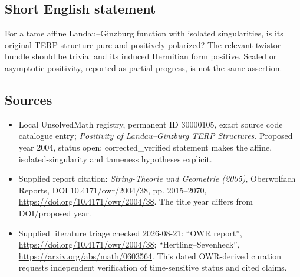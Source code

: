 \documentclass[11pt]{article}
\begin{document}
\subsection{Short English statement}
For a tame affine Landau--Ginzburg function with isolated singularities, is its original TERP structure pure and positively polarized? The relevant twistor bundle should be trivial and its induced Hermitian form positive. Scaled or asymptotic positivity, reported as partial progress, is not the same assertion.
\subsection{Sources}
\begin{itemize}
\item Local UnsolvedMath registry, permanent ID 30000105, exact source code catalogue entry; \emph{Positivity of Landau--Ginzburg TERP Structures}. Proposed year 2004, status open; corrected\_verified statement makes the affine, isolated-singularity and tameness hypotheses explicit.
\item Supplied report citation: \emph{String-Theorie und Geometrie (2005)}, Oberwolfach Reports, DOI 10.4171/owr/2004/38, pp. 2015--2070, \url{https://doi.org/10.4171/owr/2004/38}. The title year differs from DOI/proposed year.
\item Supplied literature triage checked 2026-08-21: ``OWR report'', \url{https://doi.org/10.4171/owr/2004/38}; ``Hertling--Sevenheck'', \url{https://arxiv.org/abs/math/0603564}. This dated OWR-derived curation requests independent verification of time-sensitive status and cited claims.
\end{itemize}
\end{document}
